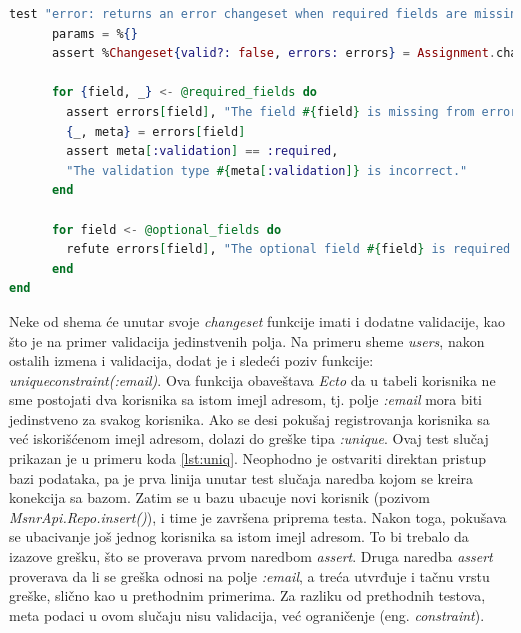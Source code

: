 \documentclass[12pt,oneside]{memoir}
\begin{document}
\begin{lstlisting}[language=elixir, caption={Test slučaj neuspešne upotrebe funkcije \emph{changeset/2}, sa nedostajućim parametrima},captionpos=b, label={lst:req}]
test "error: returns an error changeset when required fields are missing" do
      params = %{}
      assert %Changeset{valid?: false, errors: errors} = Assignment.changeset(%Assignment{}, params)

      for {field, _} <- @required_fields do
        assert errors[field], "The field #{field} is missing from errors."
        {_, meta} = errors[field]
        assert meta[:validation] == :required,
        "The validation type #{meta[:validation]} is incorrect."
      end

      for field <- @optional_fields do
        refute errors[field], "The optional field #{field} is required when it shouldn't be."
      end
end
\end{lstlisting}

\par Neke od shema će unutar svoje \emph{changeset} funkcije imati i dodatne validacije, kao što je na primer validacija jedinstvenih polja. Na primeru sheme \emph{users}, nakon ostalih izmena i validacija, dodat je i sledeći poziv funkcije: \emph{unique{\textunderscore}constraint(:email)}. Ova funkcija obaveštava \emph{Ecto} da u tabeli korisnika ne sme postojati dva korisnika sa istom imejl adresom, tj. polje \emph{:email} mora biti jedinstveno za svakog korisnika. Ako se desi pokušaj registrovanja korisnika sa već iskorišćenom imejl adresom, dolazi do greške tipa \emph{:unique}. Ovaj test slučaj prikazan je u primeru koda \ref{lst:uniq}. Neophodno je ostvariti direktan pristup bazi podataka, pa je prva linija unutar test slučaja naredba kojom se kreira konekcija sa bazom. Zatim se u bazu ubacuje novi korisnik (pozivom \emph{MsnrApi.Repo.insert()}), i time je završena priprema testa. Nakon toga, pokušava se ubacivanje još jednog korisnika sa istom imejl adresom. To bi trebalo da izazove grešku, što se proverava prvom naredbom \emph{assert}. Druga naredba \emph{assert} proverava da li se greška odnosi na polje \emph{:email}, a treća utvrđuje i tačnu vrstu greške, slično kao u prethodnim primerima. Za razliku od prethodnih testova, meta podaci u ovom slučaju nisu validacija, već ograničenje (eng. \emph{constraint}). 
\end{document}
